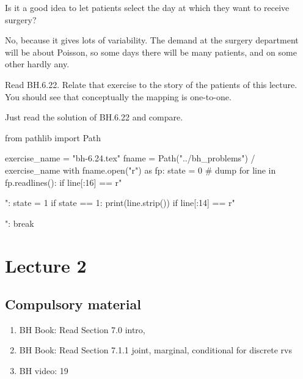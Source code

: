 \begin{exercise}
Is it a good idea to let patients select the day at which they want to receive surgery?
\begin{solution}
No, because it gives lots of variability.
The demand at the surgery department will be about Poisson, so some days there will be many patients, and on some other hardly any.
\end{solution}
\end{exercise}

\begin{exercise}
Read BH.6.22. Relate that exercise to the story of the patients of this lecture. You should see that conceptually the mapping is one-to-one.
\begin{solution}
Just read the solution of BH.6.22 and compare.
\end{solution}
\end{exercise}

\begin{pycode}
from pathlib import Path

exercise_name = "bh-6.24.tex"
fname = Path("../bh_problems") / exercise_name
with fname.open("r") as fp:
    state = 0  # dump
    for line in fp.readlines():
        if line[:16] == r"\begin{exercise}":
            state = 1
        if state == 1:
            print(line.strip())
        if line[:14] == r"\end{exercise}":
            break
\end{pycode}



\section{Lecture 2}
\label{sec:lecture-1}

\subsection{Compulsory material}

\begin{enumerate}
\item BH Book: Read Section 7.0 intro,
\item BH Book: Read Section 7.1.1 joint, marginal, conditional for discrete rvs
\item BH video: 19
\end{enumerate}


